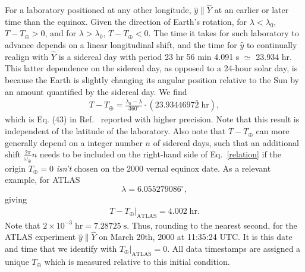 For a laboratory positioned at any other longitude, 
$\widehat{y} \parallel \widehat{Y}$ at an earlier
or later time than the equinox.  
Given the direction of Earth's rotation, 
for $\lambda < \lambda_0$, 
$T - T_\oplus > 0$, and for $\lambda > \lambda_0$, 
$T - T_\oplus < 0$. 
The time it takes for such laboratory to advance 
depends on a linear longitudinal shift,
and the time for $\widehat{y}$ to 
continually realign with $\widehat{Y}$ is a sidereal 
day with period 23 hr 56 min 4.091 s $\simeq$ 23.934 hr. 
This latter dependence on the sidereal day, 
as opposed to a 24-hour solar
day, is because the Earth is slightly changing
its angular position relative to the Sun
by an amount quantified by the sidereal day.
We find 
\begin{align}
\label{relation}
T - T_\oplus = \frac{\lambda_0 - \lambda}{360^{\circ}}\cdot 
(23.9344697\bar{2}\;\text{hr}),
\end{align}
which is Eq. (43) in Ref.~\cite{kd16} reported with higher precision. 
Note that this result is independent of the latitude of the laboratory. 
Also note that $T - T_\oplus$ can more generally depend
on a integer number $n$ of 
sidereal days, such that an 
additional shift $\frac{2\pi}{\omega_{\oplus}}n$
needs to be included on the right-hand side 
of Eq.~\eqref{relation} if the origin $T_\oplus = 0$ 
\textit{isn't} chosen on the 2000 vernal equinox date. 
%
As a relevant example, for ATLAS 
\begin{equation}
\lambda = 6.055279086^\circ,
\end{equation}
giving
\begin{align}
\label{TshiftATLAS}
T - T_\oplus\bigg|_{\text{ATLAS}} = 4.002\;\text{hr}.
\end{align}
Note that $2\times 10^{-3}\;\text{hr} = 7.28725\;\text{s}$. 
Thus, rounding to the nearest second, for the ATLAS 
experiment $\widehat{y}\parallel \widehat{Y}$ 
on March 20th, 2000 at 11:35:24 UTC.
It is this date and time 
that we identify with $T_\oplus\big|_{\text{ATLAS}} = 0$.
All data timestamps are assigned a 
unique $T_\oplus$ which is measured relative to this initial condition.
%


